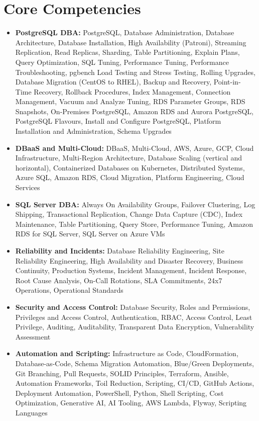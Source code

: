 \documentclass[10pt,a4paper]{article}
\begin{document}
\section{Core Competencies}
\begin{itemize}
  \item \textbf{PostgreSQL DBA:} PostgreSQL, Database Administration, Database Architecture, Database Installation, High Availability (Patroni), Streaming Replication, Read Replicas, Sharding, Table Partitioning, Explain Plans, Query Optimization, SQL Tuning, Performance Tuning, Performance Troubleshooting, pgbench Load Testing and Stress Testing, Rolling Upgrades, Database Migration (CentOS to RHEL), Backup and Recovery, Point-in-Time Recovery, Rollback Procedures, Index Management, Connection Management, Vacuum and Analyze Tuning, RDS Parameter Groups, RDS Snapshots, On-Premises PostgreSQL, Amazon RDS and Aurora PostgreSQL, PostgreSQL Flavours, Install and Configure PostgreSQL, Platform Installation and Administration, Schema Upgrades
  \item \textbf{DBaaS and Multi-Cloud:} DBaaS, Multi-Cloud, AWS, Azure, GCP, Cloud Infrastructure, Multi-Region Architecture, Database Scaling (vertical and horizontal), Containerized Databases on Kubernetes, Distributed Systems, Azure SQL, Amazon RDS, Cloud Migration, Platform Engineering, Cloud Services
  \item \textbf{SQL Server DBA:} Always On Availability Groups, Failover Clustering, Log Shipping, Transactional Replication, Change Data Capture (CDC), Index Maintenance, Table Partitioning, Query Store, Performance Tuning, Amazon RDS for SQL Server, SQL Server on Azure VMs
  \item \textbf{Reliability and Incidents:} Database Reliability Engineering, Site Reliability Engineering, High Availability and Disaster Recovery, Business Continuity, Production Systems, Incident Management, Incident Response, Root Cause Analysis, On-Call Rotations, SLA Commitments, 24x7 Operations, Operational Standards
  \item \textbf{Security and Access Control:} Database Security, Roles and Permissions, Privileges and Access Control, Authentication, RBAC, Access Control, Least Privilege, Auditing, Auditability, Transparent Data Encryption, Vulnerability Assessment
  \item \textbf{Automation and Scripting:} Infrastructure as Code, CloudFormation, Database-as-Code, Schema Migration Automation, Blue/Green Deployments, Git Branching, Pull Requests, SOLID Principles, Terraform, Ansible, Automation Frameworks, Toil Reduction, Scripting, CI/CD, GitHub Actions, Deployment Automation, PowerShell, Python, Shell Scripting, Cost Optimization, Generative AI, AI Tooling, AWS Lambda, Flyway, Scripting Languages

\end{itemize}
\end{document}
